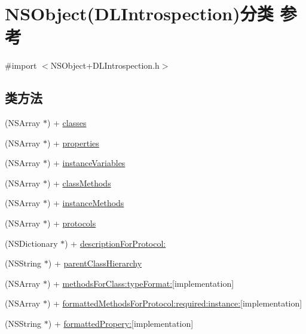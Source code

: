 \hypertarget{category_n_s_object_07_d_l_introspection_08}{}\section{N\+S\+Object(D\+L\+Introspection)分类 参考}
\label{category_n_s_object_07_d_l_introspection_08}


{\ttfamily \#import $<$N\+S\+Object+\+D\+L\+Introspection.\+h$>$}

\subsection*{类方法}
\begin{DoxyCompactItemize}
\item 
(N\+S\+Array $\ast$) + \hyperlink{category_n_s_object_07_d_l_introspection_08_aade72737ff583cbf4dc931eadc789455}{classes}
\item 
(N\+S\+Array $\ast$) + \hyperlink{category_n_s_object_07_d_l_introspection_08_afa2db3720dc242aef02b1fb520a49e98}{properties}
\item 
(N\+S\+Array $\ast$) + \hyperlink{category_n_s_object_07_d_l_introspection_08_afeebdbfaebcb1ebdd296e8857c34f92e}{instance\+Variables}
\item 
(N\+S\+Array $\ast$) + \hyperlink{category_n_s_object_07_d_l_introspection_08_aa959098616c0db88b44d8072ade1515c}{class\+Methods}
\item 
(N\+S\+Array $\ast$) + \hyperlink{category_n_s_object_07_d_l_introspection_08_a53d771aef2e868950dfefc2076c03e36}{instance\+Methods}
\item 
(N\+S\+Array $\ast$) + \hyperlink{category_n_s_object_07_d_l_introspection_08_a3df0dcf73fd285d1eb3c635376812beb}{protocols}
\item 
(N\+S\+Dictionary $\ast$) + \hyperlink{category_n_s_object_07_d_l_introspection_08_a9dba482050e2386beb173f0a1eeb89d1}{description\+For\+Protocol\+:}
\item 
(N\+S\+String $\ast$) + \hyperlink{category_n_s_object_07_d_l_introspection_08_a4ec6799920b6af207152ff1cb121dd46}{parent\+Class\+Hierarchy}
\item 
(N\+S\+Array $\ast$) + \hyperlink{category_n_s_object_07_d_l_introspection_08_a5d74fcf9ad4c5eef97312b41f1547c3c}{methods\+For\+Class\+:type\+Format\+:}{\ttfamily  \mbox{[}implementation\mbox{]}}
\item 
(N\+S\+Array $\ast$) + \hyperlink{category_n_s_object_07_d_l_introspection_08_a80c12fa810492c527bb0c2b1a9670da3}{formatted\+Methods\+For\+Protocol\+:required\+:instance\+:}{\ttfamily  \mbox{[}implementation\mbox{]}}
\item 
(N\+S\+String $\ast$) + \hyperlink{category_n_s_object_07_d_l_introspection_08_a03921362fb5bb6962e73dec1232236a4}{formatted\+Propery\+:}{\ttfamily  \mbox{[}implementation\mbox{]}}
\end{DoxyCompactItemize}


